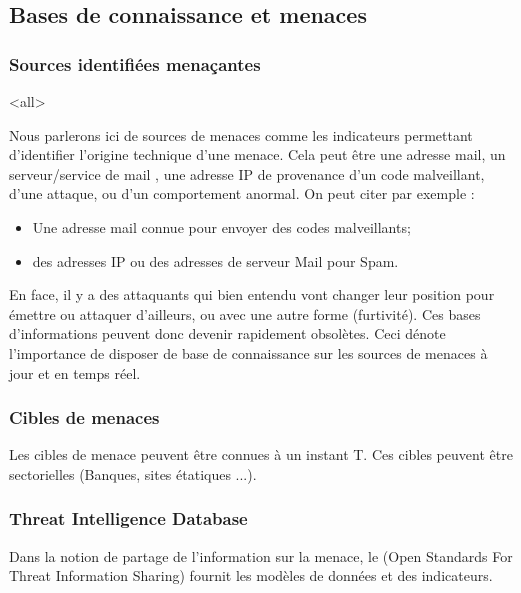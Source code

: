 \subsection{Bases de connaissance et menaces}

\subsubsection{Sources identifiées menaçantes}

\mode<all>{
{
Nous parlerons ici de sources de menaces comme les indicateurs permettant d'identifier l'origine technique d'une menace. Cela peut être une adresse mail, un serveur/service de mail , une adresse IP de provenance d'un code malveillant, d'une attaque, ou d'un comportement anormal.
On peut citer par exemple  :
\begin{itemize}
  \item Une adresse mail connue pour envoyer des codes malveillants;
  \item des adresses IP ou des adresses de serveur Mail pour Spam.
\end{itemize}
}}%


En face, il y a des attaquants qui bien entendu vont changer leur position pour émettre ou attaquer d'ailleurs, ou avec une autre forme (furtivité). Ces bases d'informations peuvent donc devenir rapidement obsolètes. Ceci dénote l'importance de disposer de base de connaissance sur les sources de menaces à jour et en temps réel.

\subsubsection{Cibles de menaces}

Les cibles de menace peuvent être connues à un instant T. Ces cibles peuvent être  sectorielles (Banques, sites étatiques ...).


\subsubsection{Threat Intelligence Database }

Dans la notion de partage de l'information sur la menace, le  (Open Standards For Threat Information Sharing) fournit les modèles de données et des indicateurs.

